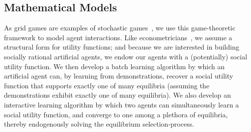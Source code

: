 
\subsection{Mathematical Models}
\label{sec:models}

As grid games are examples of stochastic
games~\cite{Fink64,Shapley53}, we use this game-theoretic
framework to model agent interactions.
%
Like econometricians~\cite{RePEc:eee:ecochp:6a-64}, we assume a
structural form for utility functions; and because we are interested
in building socially rational artificial agents, we endow our agents
with a (potentially) social utility function.
%
We then develop a batch learning algorithm by which an artificial
agent can, by learning from demonstrations, recover a social utility
function that supports exactly one of many equilibria (assuming the
demonstrations exhibit exactly one of many equilibria).
%
We also develop an interactive learning algorithm by which two agents
can simultaneously learn a social utility function, and converge
to one among a plethora of equilibria, thereby endogenously solving
the equilibrium selection-process.







